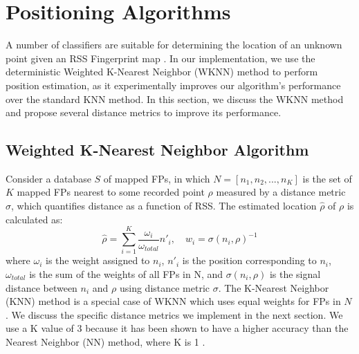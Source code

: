 \documentclass[conference]{IEEEtran}
\begin{document}
\begin{table}[!t]
\renewcommand{\arraystretch}{1.3}
\caption{MAC Coverage by Scan Numbers}
\label{tab:MAC_accuracy}
\centering
{}
\end{table}

\section{Positioning Algorithms}
A number of classifiers are suitable for determining the location of an unknown point given an RSS Fingerprint map \cite{Sayad2}\cite{Chaudhuri}. In our implementation, we use the deterministic Weighted K-Nearest Neighbor (WKNN) method to perform position estimation, as it experimentally improves our algorithm's performance over the standard KNN method. In this section, we discuss the WKNN method and propose several distance metrics to improve its performance. 
\subsection{Weighted K-Nearest Neighbor Algorithm}
\indent Consider a database $S$ of mapped FPs, in which $N=[n_1, n_2, ..., n_K]$ is the set of $K$ mapped FPs nearest to some recorded point $\rho$ measured by a distance metric $\sigma$, which quantifies distance as a function of RSS. The estimated location $\hat{\rho}$ of $\rho$ is calculated as:
\begin{equation}
\label{eq:wknn}
\hat{\rho} = \sum\limits_{i=1}^{K}\frac{\omega_i}{\omega_{total}}n'_i, \quad w_i = \sigma(n_i, \rho)^{-1}
\end{equation}
where $\omega_i$ is the weight assigned to $n_i$, $n'_i$ is the position corresponding to $n_i$, $\omega_{total}$ is the sum of the weights of all FPs in N, and $\sigma(n_i, \rho)$ is the signal distance between $n_i$ and $\rho$ using distance metric $\sigma$. The K-Nearest Neighbor (KNN) method is a special case of WKNN which uses equal weights for FPs in $N$. We discuss the specific distance metrics we implement in the next section. We use a K value of 3 because it has been shown to have a higher accuracy than the Nearest Neighbor (NN) method, where K is 1 \cite{Kokkinis}. 
\end{document}
